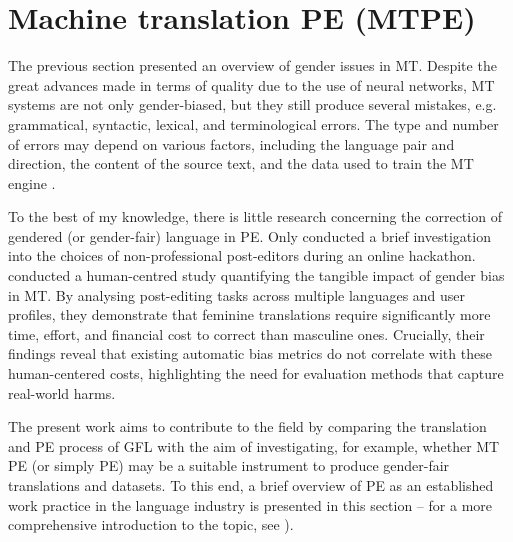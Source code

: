

\section{Machine translation PE (MTPE)} \label{sec:mtpe}
The previous section presented an overview of gender issues in MT. Despite the great advances made in terms of quality due to the use of neural networks, MT systems are not only gender-biased, but they still produce several mistakes, e.g. grammatical, syntactic, lexical, and terminological errors. The type and number of errors may depend on various factors, including the language pair and direction, the content of the source text, and the data used to train the MT engine \citep[106]{o2022deal}. 

To the best of my knowledge, there is little research concerning the correction of gendered (or gender-fair) language in PE. Only \textcite{lardellipostediting} conducted a brief investigation into the choices of non-professional post-editors during an online hackathon. \textcite{savoldi2024harm} conducted a human-centred study quantifying the tangible impact of gender bias in MT. By analysing post-editing tasks across multiple languages and user profiles, they demonstrate that feminine translations require significantly more time, effort, and financial cost to correct than masculine ones. Crucially, their findings reveal that existing automatic bias metrics do not correlate with these human-centered costs, highlighting the need for evaluation methods that capture real-world harms. 

The present work aims to contribute to the field by comparing the translation and PE process of GFL with the aim of investigating, for example, whether MT PE (or simply PE) may be a suitable instrument to produce gender-fair translations and datasets. To this end, a brief overview of PE as an established work practice in the language industry is presented in this section -- for a more comprehensive introduction to the topic, see \textcite{nitzke2021short}).

